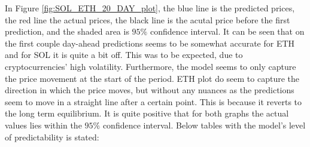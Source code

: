 \noindent In Figure \ref{fig:SOL_ETH_20_DAY_plot}, the blue line is the predicted prices, the red line the actual prices, the black line is the acutal price before the first prediction, and the shaded area is $95\%$ confidence interval. It can be seen that on the first couple day-ahead predictions seems to be somewhat accurate for ETH and for SOL it is quite a bit off. This was to be expected, due to cryptocurrencies' high volatility. Furthermore, the model seems to only capture the price movement at the start of the period. ETH plot do seem to capture the direction in which the price moves, but without any nuances as the predictions seem to move in a straight line after a certain point. This is because it reverts to the long term equilibrium. It is quite positive that for both graphs the actual values lies within the $95\%$ confidence interval. Below tables with the model's level of predictability is stated:

